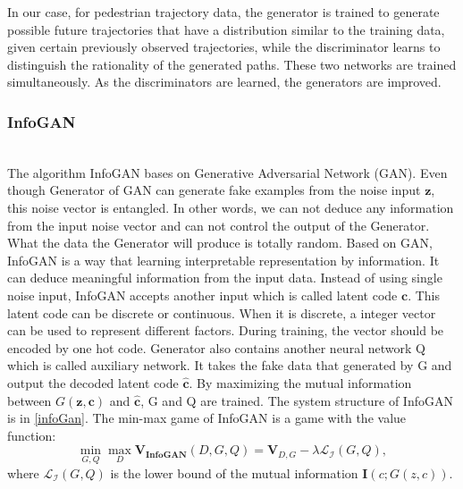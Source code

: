 In our case, for pedestrian trajectory data, the generator is trained to generate possible future trajectories that have a distribution similar to the training data, given certain previously observed trajectories, while the discriminator learns to distinguish the rationality of the generated paths. These two networks are trained simultaneously. As the discriminators are learned, the generators are improved.

\subsubsection{InfoGAN}

\hfill \\
The algorithm InfoGAN bases on Generative Adversarial Network (GAN). Even though Generator of GAN can generate fake examples from the noise input \(\mathbf{z}\), this noise vector is entangled. In other words, we can not deduce any information from the input noise vector and can not control the output of the Generator. What the data the Generator will produce is totally random. Based on GAN, InfoGAN is a way that learning interpretable representation by information. It can deduce meaningful information from the input data. Instead of using single noise input, InfoGAN accepts another input which is called latent code \(\mathbf{c}\). This latent code can be discrete or continuous. When it is discrete, a integer vector can be used to represent different factors. During training, the vector should be encoded by one hot code. Generator also contains another neural network Q which is called auxiliary network. It takes the fake data that generated by G and output the decoded latent code \( \mathbf{\hat{c}}\). By maximizing the mutual information between \( G(\mathbf{z, c})\) and \( \mathbf{\hat{c}}\), G and Q are trained. The system structure of InfoGAN is in \ref{infoGan}. The min-max game of InfoGAN is a game with the value function\cite{infogan}:
\[\min_{G,Q}\max_{D} \mathbf{V_{InfoGAN}}(D, G, Q) = \mathbf{V}_{D, G} - \lambda \mathcal{L_I}(G,Q),\] where \(\mathcal{L_I}(G,Q)\) is the lower bound of the mutual information \(\mathbf{I}(c;G(z,c))\).
